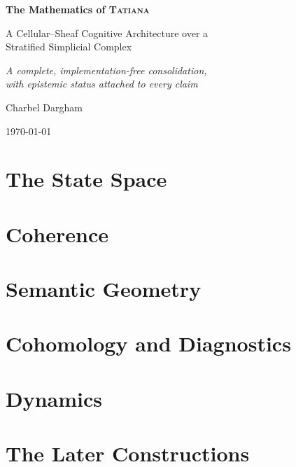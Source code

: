 \documentclass[11pt,openany]{book}
\begin{document}
\frontmatter

\begin{titlepage}
\centering
\vspace*{3cm}
{\Huge\bfseries The Mathematics of \textsc{Tatiana}\par}
\vspace{12pt}
{\Large A Cellular--Sheaf Cognitive Architecture over a\\[2pt]
 Stratified Simplicial Complex\par}
\vspace{22pt}
{\normalsize\itshape A complete, implementation-free consolidation,\\[2pt]
 with epistemic status attached to every claim\par}
\vspace{3cm}
{\large Charbel Dargham\par}
\vspace{8pt}
{\normalsize\today\par}
\end{titlepage}



\tableofcontents

\mainmatter

\part{The State Space}


\part{Coherence}


\part{Semantic Geometry}


\part{Cohomology and Diagnostics}


\part{Dynamics}


\part{The Later Constructions}

\end{document}
